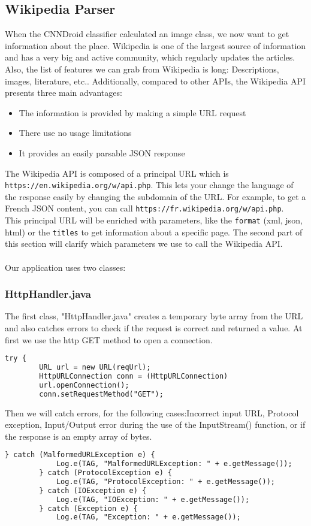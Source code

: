 \subsection {Wikipedia Parser}\label{wikipedia_parser}
When the CNNDroid classifier calculated an image class, we now want to get information about the place. Wikipedia is one of the largest source of information and has a very big and active community, which regularly updates the articles. Also, the list of features we can grab from Wikipedia is long: Descriptions, images, literature, etc..
Additionally, compared to other APIs, the Wikipedia API presents three main advantages:
\begin{itemize}
    \item{The information is provided by making a simple URL request}
    \item{There use no usage limitations}
    \item{It provides an easily parsable JSON response}
\end{itemize}
The Wikipedia API is composed of a principal URL which is \texttt{https://en.wikipedia.org/w/api.php}. This lets your change the language of the response easily by changing the subdomain of the URL. For example, to get a French JSON content, you can call \texttt{https://fr.wikipedia.org/w/api.php}.\\
This principal URL will be enriched with parameters, like the \texttt{format} (xml, json, html) or the \texttt{titles} to get information about a specific page. The second part of this section will clarify which parameters we use to call the Wikipedia API.\\\\

Our application uses two classes:
\subsubsection{HttpHandler.java}
The first class, "HttpHandler.java" creates a temporary byte array from the URL and also catches errors to check if the request is correct and returned a value.
At first we use the http GET method to open a connection.
\begin{lstlisting}[language=XML, basicstyle=\scriptsize]
    try {
        URL url = new URL(reqUrl);
        HttpURLConnection conn = (HttpURLConnection)
        url.openConnection();
        conn.setRequestMethod("GET");
\end{lstlisting}

Then we will catch errors, for the following cases:Incorrect input URL, Protocol exception, Input/Output error during the use of the InputStream() function, or if the response is an empty array of bytes.
\begin{lstlisting}[language=XML, basicstyle=\scriptsize]
    } catch (MalformedURLException e) {
            Log.e(TAG, "MalformedURLException: " + e.getMessage());
        } catch (ProtocolException e) {
            Log.e(TAG, "ProtocolException: " + e.getMessage());
        } catch (IOException e) {
            Log.e(TAG, "IOException: " + e.getMessage());
        } catch (Exception e) {
            Log.e(TAG, "Exception: " + e.getMessage());
\end{lstlisting}

